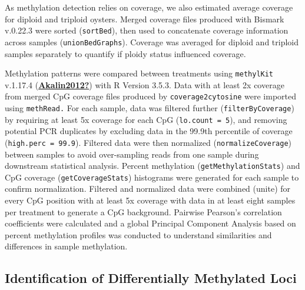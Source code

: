 \documentclass [11pt, proquest] {uwthesis}[2015/03/03]
\begin{document}
As methylation detection relies on coverage, we also estimated average coverage for diploid and triploid oysters. Merged coverage files produced with Bismark v.0.22.3 were sorted (\texttt{sortBed}), then used to concatenate coverage information across samples (\texttt{unionBedGraphs}). Coverage was averaged for diploid and triploid samples separately to quantify if ploidy status influenced coverage.

Methylation patterns were compared between treatments using \texttt{methylKit} v.1.17.4 (\protect\hyperlink{ref-Akalin2012}{\textbf{Akalin2012?}}) with R Version 3.5.3. Data with at least 2x coverage from merged CpG coverage files produced by \texttt{coverage2cytosine} were imported using \texttt{methRead.} For each sample, data was filtered further (\texttt{filterByCoverage}) by requiring at least 5x coverage for each CpG (\texttt{lo.count\ =\ 5}), and removing potential PCR duplicates by excluding data in the 99.9th percentile of coverage (\texttt{high.perc\ =\ 99.9}). Filtered data were then normalized (\texttt{normalizeCoverage}) between samples to avoid over-sampling reads from one sample during downstream statistical analysis. Percent methylation (\texttt{getMethylationStats}) and CpG coverage (\texttt{getCoverageStats}) histograms were generated for each sample to confirm normalization. Filtered and normalized data were combined (unite) for every CpG position with at least 5x coverage with data in at least eight samples per treatment to generate a CpG background. Pairwise Pearson's correlation coefficients were calculated and a global Principal Component Analysis based on percent methylation profiles was conducted to understand similarities and differences in sample methylation.

\hypertarget{identification-of-differentially-methylated-loci-1}{%
\subsection{Identification of Differentially Methylated Loci}\label{identification-of-differentially-methylated-loci-1}}
\end{document}
